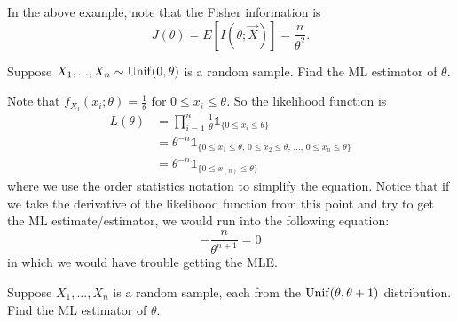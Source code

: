\documentclass[notoc,notitlepage]{tufte-book}
\begin{document}
\begin{note}
  In the above example, note that the Fisher information is
  \begin{equation*}
    J(\theta) = E[I(\theta; \vec{X})] = \frac{n}{\theta^2}.
  \end{equation*}
\end{note}

\begin{eg}\label{eg:eg_where_derivatives_for_mle_fail}
  Suppose $X_1, ..., X_n \sim \operatorname{Unif}(0, \theta)$ is a random sample. Find the ML estimator of $\theta$.
\end{eg}

\begin{solution}
  Note that $f_{X_i}(x_i; \theta) = \frac{1}{\theta}$ for $0 \leq x_i \leq \theta$. So the likelihood function is
  \begin{align*}
    L(\theta) &= \prod_{i=1}^{n} \frac{1}{\theta} \mathbb{1}_{\{0 \leq x_i \leq \theta\}} \\
              &= \theta^{-n} \mathbb{1}_{\{ 0 \leq x_1 \leq \theta, \, 0 \leq x_2 \leq \theta, \, ..., \, 0 \leq x_n \leq \theta\}} \\
              &= \theta^{-n} \mathbb{1}_{\{0 \leq x_{(n)} \leq \theta\}}
  \end{align*}
  where we use the order statistics notation to simplify the equation. Notice that if we take the derivative of the likelihood function from this point and try to get the ML estimate/estimator, we would run into the following equation:
  \begin{equation*}
    - \frac{n}{\theta^{n + 1}} = 0
  \end{equation*}
  in which we would have trouble getting the MLE.
\end{solution}

\begin{eg}[Example 6.8]
  Suppose $X_1, ..., X_n$ is a random sample, each from the $\operatorname{Unif}(\theta, \theta + 1)$ distribution. Find  the ML estimator of $\theta$.
\end{eg}
\end{document}
